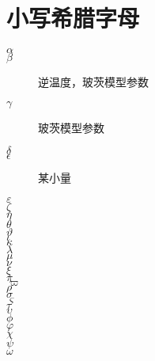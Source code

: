 \documentclass{ctexart}
\begin{document}
\section{小写希腊字母}
\begin{description}
    \item[$\alpha$]
    \item[$\beta $] 逆温度，玻茨模型参数
    \item[$\gamma$ ] 玻茨模型参数
    \item[$\delta $]
    \item[$\epsilon$ ] 某小量
    \item[$\varepsilon$ ] 
    \item[$\zeta$]
    \item[$\eta$]
    \item[$\theta$]
    \item[$\vartheta$]
    \item[$\iota$]
    \item[$\kappa$]
    \item[$\lambda$]
    \item[$\mu$]
    \item[$\nu$]
    \item[$\xi$]
    \item[$\pi$]
    \item[$\varpi$]
    \item[$\rho $]
    \item[$\sigma$]
    \item[$\varsigma$]
    \item[$\tau $]
    \item[$\upsilon$ ]
    \item[$\phi $]
    \item[$\varphi $]
    \item[$\chi $]
    \item[$\psi$ ]
    \item[$\omega $]

\end{description}
\end{document}
